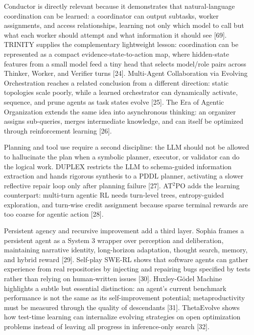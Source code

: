 Conductor is directly relevant because it demonstrates that
natural-language coordination can be learned: a coordinator can output
subtasks, worker assignments, and access relationships, learning not
only which model to call but what each worker should attempt and what
information it should see {[}69{]}. TRINITY supplies the complementary
lightweight lesson: coordination can be represented as a compact
evidence-state-to-action map, where hidden-state features from a small
model feed a tiny head that selects model/role pairs across Thinker,
Worker, and Verifier turns {[}24{]}. Multi-Agent Collaboration via
Evolving Orchestration reaches a related conclusion from a different
direction: static topologies scale poorly, while a learned orchestrator
can dynamically activate, sequence, and prune agents as task states
evolve {[}25{]}. The Era of Agentic Organization extends the same idea
into asynchronous thinking: an organizer assigns sub-queries, merges
intermediate knowledge, and can itself be optimized through
reinforcement learning {[}26{]}.

Planning and tool use require a second discipline: the LLM should not be
allowed to hallucinate the plan when a symbolic planner, executor, or
validator can do the logical work. DUPLEX restricts the LLM to
schema-guided information extraction and hands rigorous synthesis to a
PDDL planner, activating a slower reflective repair loop only after
planning failure {[}27{]}. AT\(^2\)PO adds the learning counterpart:
multi-turn agentic RL needs turn-level trees, entropy-guided
exploration, and turn-wise credit assignment because sparse terminal
rewards are too coarse for agentic action {[}28{]}.

Persistent agency and recursive improvement add a third layer. Sophia
frames a persistent agent as a System 3 wrapper over perception and
deliberation, maintaining narrative identity, long-horizon adaptation,
thought search, memory, and hybrid reward {[}29{]}. Self-play SWE-RL
shows that software agents can gather experience from real repositories
by injecting and repairing bugs specified by tests rather than relying
on human-written issues {[}30{]}. Huxley-Gödel Machine highlights a
subtle but essential distinction: an agent's current benchmark
performance is not the same as its self-improvement potential;
metaproductivity must be measured through the quality of descendants
{[}31{]}. ThetaEvolve shows how test-time learning can internalize
evolving strategies on open optimization problems instead of leaving all
progress in inference-only search {[}32{]}.

